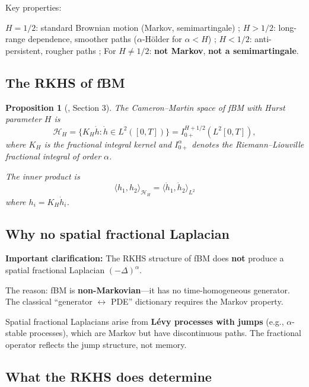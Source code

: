 \documentclass[11pt]{article}
\newtheorem{proposition}[theorem]{Proposition}
\theoremstyle{definition}
\newcommand{\Hi}{\mathcal{H}}
\newcommand{\ip}[2]{\langle #1, #2 \rangle}
\begin{document}
Key properties:

$H = 1/2$: standard Brownian motion (Markov, semimartingale) ; $H > 1/2$: long-range dependence, smoother paths ($\alpha$-Hölder for $\alpha < H$) ; $H < 1/2$: anti-persistent, rougher paths ; For $H \neq 1/2$: \textbf{not Markov}, \textbf{not a semimartingale}.

\subsection{The RKHS of fBM}

\begin{proposition}[\cite{PaperII}, Section 3]\label{prop:fbm-rkhs}
The Cameron--Martin space of fBM with Hurst parameter $H$ is
\begin{equation}
\Hi_H = \{K_H \dot{h} : \dot{h} \in L^2([0,T])\} = I^{H+1/2}_{0+}(L^2[0,T]),
\end{equation}
where $K_H$ is the fractional integral kernel and $I^\alpha_{0+}$ denotes the Riemann--Liouville fractional integral of order $\alpha$.

The inner product is
\begin{equation}
\ip{h_1}{h_2}_{\Hi_H} = \ip{\dot{h}_1}{\dot{h}_2}_{L^2}
\end{equation}
where $h_i = K_H \dot{h}_i$.
\end{proposition}

\subsection{Why no spatial fractional Laplacian}

\textbf{Important clarification:} The RKHS structure of fBM does \textbf{not} produce a spatial fractional Laplacian $(-\Delta)^\alpha$.

The reason: fBM is \textbf{non-Markovian}---it has no time-homogeneous generator. The classical ``generator $\leftrightarrow$ PDE'' dictionary requires the Markov property.

Spatial fractional Laplacians arise from \textbf{Lévy processes with jumps} (e.g., $\alpha$-stable processes), which are Markov but have discontinuous paths. The fractional operator reflects the jump structure, not memory.

\begin{center}

\end{center}

\subsection{What the RKHS does determine}
\end{document}
